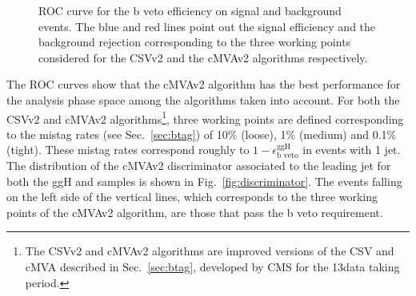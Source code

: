\begin{figure}[htb]
\centering
{}
\caption{ROC curve for the b veto efficiency on signal and background events. The blue and red lines point out the signal efficiency and the background rejection corresponding to the three working points considered for the CSVv2 and the cMVAv2 algorithms
respectively.}\label{fig:btag}
\end{figure}

The ROC curves show that the cMVAv2 algorithm has the best performance for the analysis phase space among the algorithms taken into account. For both the CSVv2 and cMVAv2 algorithms\footnote{The CSVv2 and cMVAv2 algorithms are improved versions of the CSV and cMVA described in Sec.~\ref{sec:btag}, developed by CMS for the 13\TeV data taking period.}, three working points are defined corresponding to the mistag rates (see Sec.~\ref{sec:btag}) of 10\% (loose), 1\% (medium) and 0.1\% (tight). These mistag rates correspond roughly to $1-\epsilon_\text{b veto}^\text{ggH}$ in events with 1 jet. The distribution of the cMVAv2 discriminator associated to the leading jet for both the ggH and \ttbar samples is shown in Fig.~\ref{fig:discriminator}. The events falling on the left side of the vertical lines, which corresponds to the three working points of the cMVAv2 algorithm, are those that pass the b veto requirement.

